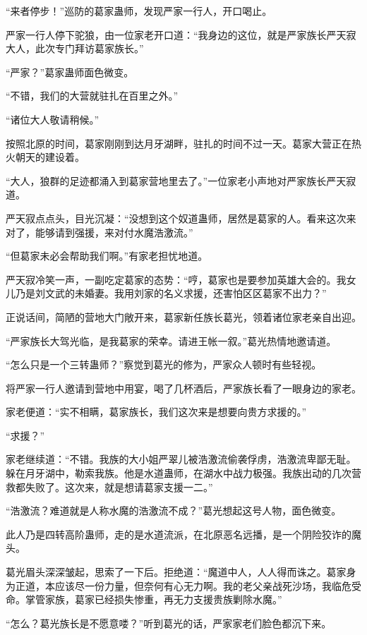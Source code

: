 
\begin{this_body}

“来者停步！”巡防的葛家蛊师，发现严家一行人，开口喝止。

严家一行人停下驼狼，由一位家老开口道：“我身边的这位，就是严家族长严天寂大人，此次专门拜访葛家族长。”

“严家？”葛家蛊师面色微变。

“不错，我们的大营就驻扎在百里之外。”

“诸位大人敬请稍候。”

按照北原的时间，葛家刚刚到达月牙湖畔，驻扎的时间不过一天。葛家大营正在热火朝天的建设着。

“大人，狼群的足迹都涌入到葛家营地里去了。”一位家老小声地对严家族长严天寂道。

严天寂点点头，目光沉凝：“没想到这个奴道蛊师，居然是葛家的人。看来这次来对了，能够请到强援，来对付水魔浩激流。”

“但葛家未必会帮助我们啊。”有家老担忧地道。

严天寂冷笑一声，一副吃定葛家的态势：“哼，葛家也是要参加英雄大会的。我女儿乃是刘文武的未婚妻。我用刘家的名义求援，还害怕区区葛家不出力？”

正说话间，简陋的营地大门敞开来，葛家新任族长葛光，领着诸位家老亲自出迎。

“严家族长大驾光临，是我葛家的荣幸。请进王帐一叙。”葛光热情地邀请道。

“怎么只是一个三转蛊师？”察觉到葛光的修为，严家众人顿时有些轻视。

将严家一行人邀请到营地中用宴，喝了几杯酒后，严家族长看了一眼身边的家老。

家老便道：“实不相瞒，葛家族长，我们这次来是想要向贵方求援的。”

“求援？”

家老继续道：“不错。我族的大小姐严翠儿被浩激流偷袭俘虏，浩激流卑鄙无耻。躲在月牙湖中，勒索我族。他是水道蛊师，在湖水中战力极强。我族出动的几次营救都失败了。这次来，就是想请葛家支援一二。”

“浩激流？难道就是人称水魔的浩激流不成？”葛光想起这号人物，面色微变。

此人乃是四转高阶蛊师，走的是水道流派，在北原恶名远播，是一个阴险狡诈的魔头。

葛光眉头深深皱起，思索了一下后。拒绝道：“魔道中人，人人得而诛之。葛家身为正道，本应该尽一份力量，但奈何有心无力啊。我的老父亲战死沙场，我临危受命。掌管家族，葛家已经损失惨重，再无力支援贵族剿除水魔。”

“怎么？葛光族长是不愿意喽？”听到葛光的话，严家家老们脸色都沉下来。


\end{this_body}
